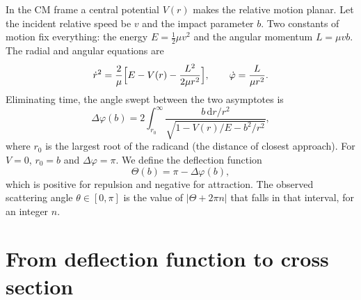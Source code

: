 \documentclass[11pt,a4paper]{book}
\numberwithin{equation}{chapter}
\newcommand{\dd}{\mathrm{d}}
\begin{document}
In the CM frame a central potential $V(r)$ makes the relative motion planar.
Let the incident relative speed be $v$ and the impact parameter $b$. Two
constants of motion fix everything: the energy $E=\tfrac12\mu v^2$ and the
angular momentum $L=\mu vb$. The radial and angular equations are
\[
  \dot r^2=\frac2\mu\Bigl[E-V(r)-\frac{L^2}{2\mu r^2}\Bigr],\qquad
  \dot\varphi=\frac{L}{\mu r^2}.
\]
Eliminating time, the angle swept between the two asymptotes is
\begin{equation}\label{eq:phi-swept}
  \Delta\varphi(b)=2\int_{r_0}^{\infty}
     \frac{b\,\dd r/r^2}{\sqrt{1-V(r)/E-b^2/r^2}},
\end{equation}
where $r_0$ is the largest root of the radicand (the distance of closest
approach). For $V=0$, $r_0=b$ and $\Delta\varphi=\pi$. We define the
deflection function
\begin{equation}\label{eq:deflection}
  \Theta(b)=\pi-\Delta\varphi(b),
\end{equation}
which is positive for repulsion and negative for attraction. The observed
scattering angle $\theta\in[0,\pi]$ is the value of $|\Theta+2\pi n|$ that falls
in that interval, for an integer $n$.

\section{From deflection function to cross section}
\end{document}
